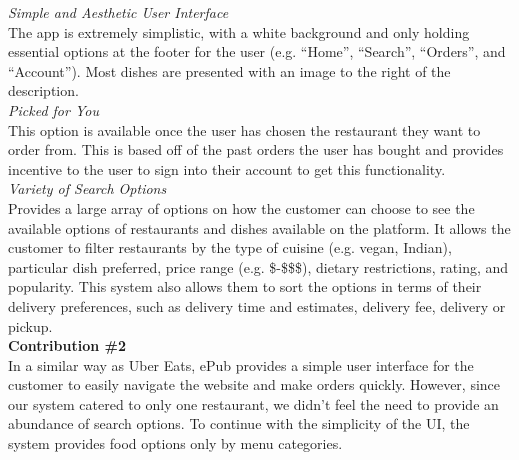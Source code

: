 \documentclass[runningheads]{llncs}
\begin{document}
\noindent \textit{Simple and Aesthetic User Interface} \\
The app is extremely simplistic, with a white background and only holding essential options at the footer for the user (e.g. “Home”, “Search”, “Orders”, and “Account”). Most dishes are presented with an image to the right of the description. \\

\noindent\textit{Picked for You} \\ 
This option is available once the user has chosen the restaurant they want to order from. This is based off of the past orders the user has bought and provides incentive to the user to sign into their account to get this functionality. \\ 

\noindent\textit{Variety of Search Options} \\ 
Provides a large array of options on how the customer can choose to see the available options of restaurants and dishes available on the platform. It allows the customer to filter restaurants by the type of cuisine (e.g. vegan, Indian), particular dish preferred, price range (e.g. \$-\$\$\$), dietary restrictions, rating, and popularity. This system also allows them to sort the options in terms of their delivery preferences, such as delivery time and estimates, delivery fee, delivery or pickup.\\ 

\noindent\textbf{Contribution \#2} \\ 
In a similar way as Uber Eats, ePub provides a simple user interface for the customer to easily navigate the website and make orders quickly. However, since our system catered to only one restaurant, we didn’t feel the need to provide an abundance of search options. To continue with the simplicity of the UI, the system provides food options only by menu categories. \\
\end{document}
